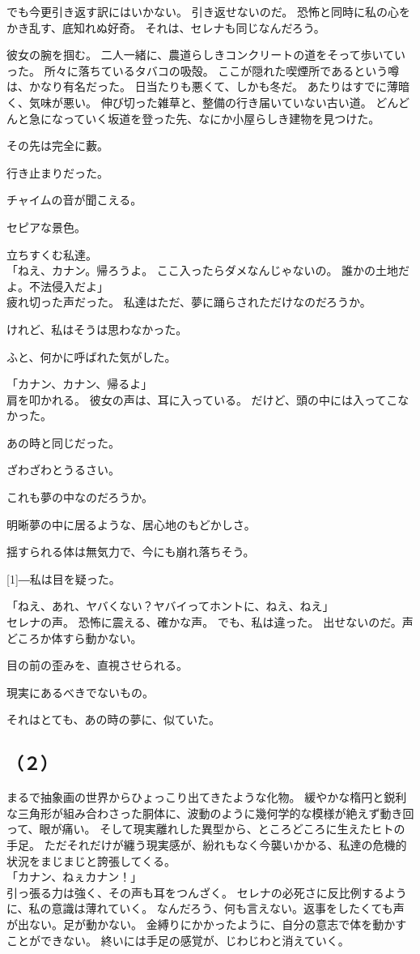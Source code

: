 \documentclass[../IHMain]{subfiles}
\begin{document}
でも今更引き返す訳にはいかない。
引き返せないのだ。
恐怖と同時に私の心をかき乱す、底知れぬ好奇。
それは、セレナも同じなんだろう。

彼女の腕を掴む。
二人一緒に、農道らしきコンクリートの道をそって歩いていった。
所々に落ちているタバコの吸殻。
ここが隠れた喫煙所であるという噂は、かなり有名だった。
日当たりも悪くて、しかも冬だ。
あたりはすでに薄暗く、気味が悪い。
伸び切った雑草と、整備の行き届いていない古い道。
どんどんと急になっていく坂道を登った先、なにか小屋らしき建物を見つけた。

その先は完全に藪。

行き止まりだった。

チャイムの音が聞こえる。

セピアな景色。

立ちすくむ私達。\\
「ねえ、カナン。帰ろうよ。
ここ入ったらダメなんじゃないの。
誰かの土地だよ。不法侵入だよ」\\
疲れ切った声だった。
私達はただ、夢に踊らされただけなのだろうか。

けれど、私はそうは思わなかった。

ふと、何かに呼ばれた気がした。

「カナン、カナン、帰るよ」\\
肩を叩かれる。
彼女の声は、耳に入っている。
だけど、頭の中には入ってこなかった。

あの時と同じだった。

ざわざわとうるさい。

これも夢の中なのだろうか。

明晰夢の中に居るような、居心地のもどかしさ。

揺すられる体は無気力で、今にも崩れ落ちそう。

\scalebox{3}[1]{―}私は目を疑った。

「ねえ、あれ、ヤバくない？ヤバイってホントに、ねえ、ねえ」\\
セレナの声。
恐怖に震える、確かな声。
でも、私は違った。
出せないのだ。声どころか体すら動かない。

目の前の歪みを、直視させられる。

現実にあるべきでないもの。

それはとても、あの時の夢に、似ていた。

\subsection*{（２）}

まるで抽象画の世界からひょっこり出てきたような化物。
緩やかな楕円と鋭利な三角形が組み合わさった胴体に、波動のように幾何学的な模様が絶えず動き回って、眼が痛い。
そして現実離れした異型から、ところどころに生えたヒトの手足。
ただそれだけが纏う現実感が、紛れもなく今襲いかかる、私達の危機的状況をまじまじと誇張してくる。\\
「カナン、ねぇカナン！」\\
引っ張る力は強く、その声も耳をつんざく。
セレナの必死さに反比例するように、私の意識は薄れていく。
なんだろう、何も言えない。返事をしたくても声が出ない。足が動かない。
金縛りにかかったように、自分の意志で体を動かすことができない。
終いには手足の感覚が、じわじわと消えていく。
\end{document}
